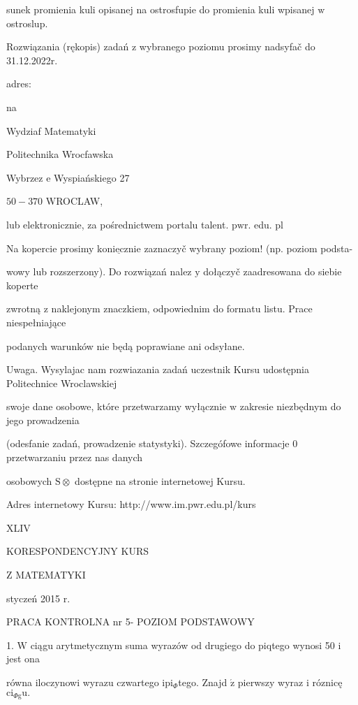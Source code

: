 \documentclass[a4paper,12pt]{article}
\begin{document}
sunek promienia kuli opisanej na ostrosfupie do promienia kuli wpisanej $\mathrm{w}$ ostroslup.

Rozwiązania (rękopis) zadań z wybranego poziomu prosimy nadsyfač do 31.12.2022r.

adres:

na

Wydziaf Matematyki

Politechnika Wrocfawska

Wybrzez $\mathrm{e}$ Wyspiańskiego 27

$50-370$ WROCLAW,

lub elektronicznie, za pośrednictwem portalu talent. $\mathrm{p}\mathrm{w}\mathrm{r}$. edu. pl

Na kopercie prosimy $\underline{\mathrm{k}\mathrm{o}\mathrm{n}\mathrm{i}\mathrm{e}\mathrm{c}\mathrm{z}\mathrm{n}\mathrm{i}\mathrm{e}}$ zaznaczyč wybrany poziom! (np. poziom podsta-

wowy lub rozszerzony). Do rozwiązań nalez $\mathrm{y}$ dołączyč zaadresowana do siebie koperte

zwrotną $\mathrm{z}$ naklejonym znaczkiem, odpowiednim do formatu listu. Prace niespełniające

podanych warunków nie będą poprawiane ani odsyłane.

Uwaga. Wysylajac nam rozwiazania zadań uczestnik Kursu udostępnia Politechnice Wroclawskiej

swoje dane osobowe, które przetwarzamy wyłącznie $\mathrm{w}$ zakresie niezbędnym do jego prowadzenia

(odesfanie zadań, prowadzenie statystyki). Szczegófowe informacje $0$ przetwarzaniu przez nas danych

osobowych $\mathrm{S}\otimes$ dostępne na stronie internetowej Kursu.

Adres internetowy Kursu: http://www.im.pwr.edu.pl/kurs







XLIV

KORESPONDENCYJNY KURS

Z MATEMATYKI

styczeń 2015 r.

PRACA KONTROLNA nr 5- POZIOM PODSTAWOWY

1. $\mathrm{W}$ ciągu arytmetycznym suma wyrazów od drugiego do piqtego wynosi 50 $\mathrm{i}$ jest ona

równa iloczynowi wyrazu czwartego $\mathrm{i}\mathrm{p}\mathrm{i}_{\Phi}$tego. Znajd $\acute{\mathrm{z}}$ pierwszy wyraz $\mathrm{i}$ róznicę $\mathrm{c}\mathrm{i}_{\Phi \mathrm{g}}\mathrm{u}.$
\end{document}
